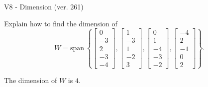 \begin{exercise}
  \begin{exerciseTitle}V8 - Dimension (ver. 261)\end{exerciseTitle}
  \begin{exerciseStatement}
    Explain how to find the dimension of 
\[W=\mathrm{span}\ \left\{\left[\begin{array}{r}
0 \\
-3 \\
2 \\
-3 \\
-4
\end{array}\right] , \left[\begin{array}{r}
1 \\
-3 \\
1 \\
-2 \\
3
\end{array}\right] , \left[\begin{array}{r}
0 \\
1 \\
-4 \\
-3 \\
-2
\end{array}\right] , \left[\begin{array}{r}
-4 \\
2 \\
-1 \\
0 \\
2
\end{array}\right]\right\}.\]



  \end{exerciseStatement}
  \begin{exerciseAnswer}
   The dimension of \(W\) is  \(4\).
  


  \end{exerciseAnswer}
\end{exercise}